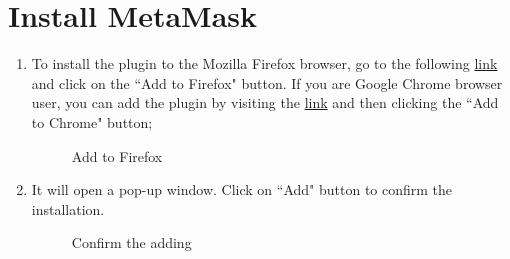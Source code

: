 \documentclass[ManualeUtente]{subfiles}
\begin{document}
\section{Install MetaMask}
\begin{enumerate}
	\item To install the plugin to the Mozilla Firefox browser, go to the following 
	\href{https://addons.mozilla.org/en-US/firefox/addon/ether-metamask/}{link}
	 and click on the \textquotedblleft Add to Firefox" button. If you are Google Chrome browser user, you can add the plugin by visiting the  \href{https://chrome.google.com/webstore/detail/metamask/nkbihfbeogaeaoehlefnkodbefgpgknn}{link} and then clicking the  \textquotedblleft Add to Chrome" button;
	\begin{figure}[H]
		\centering
		\caption{Add to Firefox}
		\label{fig:Add to Firefox}
	\end{figure}
	\item It will open a pop-up window. Click on \textquotedblleft Add" button to confirm the installation.
	\begin{figure}[H]
		\centering
		\caption{Confirm the adding}
		\label{fig:Confirm the adding}
	\end{figure}
\end{enumerate}
\end{document}
